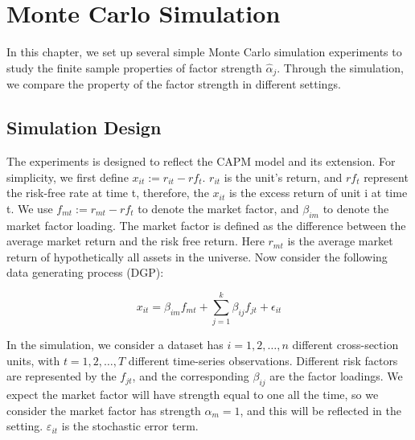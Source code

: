 \chapter{Monte Carlo Simulation}\label{MC}
	In this chapter, we set up several simple Monte Carlo simulation experiments to study the finite sample properties of factor strength $\hat{\alpha}_j$.
	Through the simulation, we compare the property of the factor strength in different settings.
	
\section{Simulation Design}
The experiments is designed to reflect the CAPM model and its extension.
For simplicity, we first define $x_{it} := r_{it}- rf_{t}$.
$r_{it}$ is the unit's return, and $rf_{t}$ represent the risk-free rate at time t, therefore, the $x_{it}$ is the excess return of unit i at time t.
We use $f_{mt}:=r_{mt} - rf_{t}$ to denote the market factor, and $\beta_{im}$ to denote the market factor loading.
The market factor is defined as the difference between the average market return and the risk free return.
Here $r_{mt}$ is the average market return of hypothetically all assets in the universe.
Now consider the following data generating process (DGP):
	
		\[ x_{it} = \beta_{im}f_{mt} +  \sum_{j=1}^k\beta_{ij}f_{jt} +\epsilon_{it}  \]
	


In the simulation, we consider a dataset has $i = 1, 2,\dots, n$ different cross-section units, with $t= 1, 2,\dots, T$ different time-series observations. 
Different risk factors are represented by the $f_{jt}$, and the corresponding $\beta_{ij}$ are the factor loadings.
We expect the market factor will have strength equal to one all the time, so we consider the market factor has strength $\alpha_m = 1$, and this will be reflected in the setting.
$\varepsilon_{it}$ is the stochastic error term.

